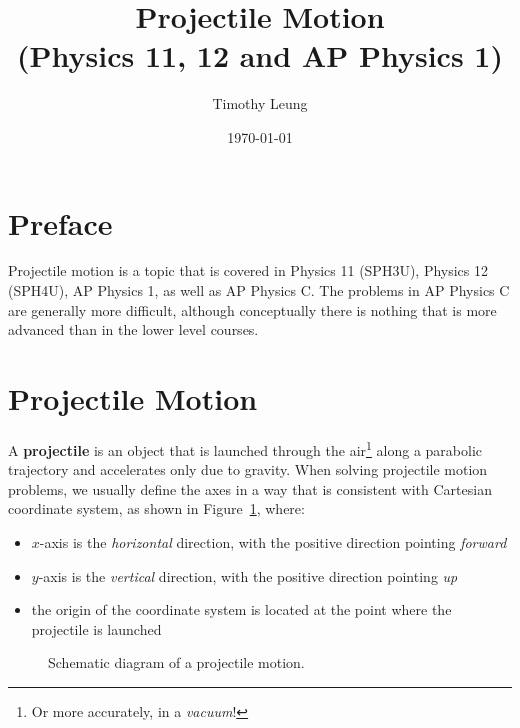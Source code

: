 \documentclass[11pt,titlepage,twoside]{article}
\title{Projectile Motion\\(Physics 11, 12 and AP Physics 1)}
\author{Timothy Leung}
\date{\today}
\begin{document}
\maketitle
\cleardoublepage

\section*{Preface}
Projectile motion is a topic that is covered in Physics 11 (SPH3U), Physics
12 (SPH4U), AP Physics 1, as well as AP Physics C. The problems in AP Physics C
are generally more difficult, although conceptually there is nothing that is
more advanced than in the lower level courses.
\cleardoublepage

\section{Projectile Motion}
A \textbf{projectile} is an object that is launched through the air\footnote{Or
more accurately, in a \emph{vacuum}!} along a parabolic trajectory and
accelerates only due to gravity. When solving projectile motion problems, we
usually define the axes in a way that is consistent with Cartesian coordinate
system, as shown in Figure~\ref{fig:projectile}, where:
\begin{itemize}[nosep]
\item $x$-axis is the \emph{horizontal} direction, with the positive direction
  pointing \emph{forward}
\item $y$-axis is the \emph{vertical} direction, with the positive direction
  pointing \emph{up}
\item the origin of the coordinate system is located at the point where the
  projectile is launched
\end{itemize}
\begin{figure}[ht]
  \centering
  \caption{Schematic diagram of a projectile motion.}
  \label{fig:projectile}
\end{figure}
\end{document}
